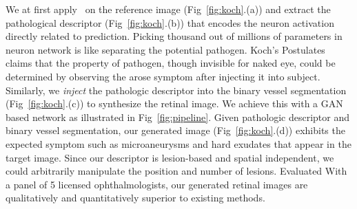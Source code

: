 \documentclass[letterpaper]{article} %
\begin{document}
    We at first apply~\cite{oO2016detector} on the  reference image (Fig~\ref{fig:koch}.(a)) and extract the pathological descriptor (Fig~\ref{fig:koch}.(b)) that encodes the neuron activation directly related to prediction. Picking thousand out of  millions of parameters in neuron network is like separating the potential pathogen. Koch's Postulates claims that the property of pathogen, though invisible for naked eye, could be determined by observing the arose symptom after injecting it into subject.  Similarly, we \emph{inject} the pathologic descriptor into the binary vessel segmentation (Fig~\ref{fig:koch}.(c)) to synthesize the retinal image. We achieve this with a GAN based network as illustrated in Fig~\ref{fig:pipeline}. Given pathologic descriptor and binary vessel segmentation, our generated image (Fig~\ref{fig:koch}.(d))  exhibits the expected symptom such as microaneurysms and hard exudates that appear in the target image. Since our descriptor is lesion-based and spatial independent, we could arbitrarily manipulate the position and number of lesions. Evaluated With a panel of 5  licensed  ophthalmologists, our generated retinal images are  qualitatively and quantitatively superior to existing methods.




\end{document}
